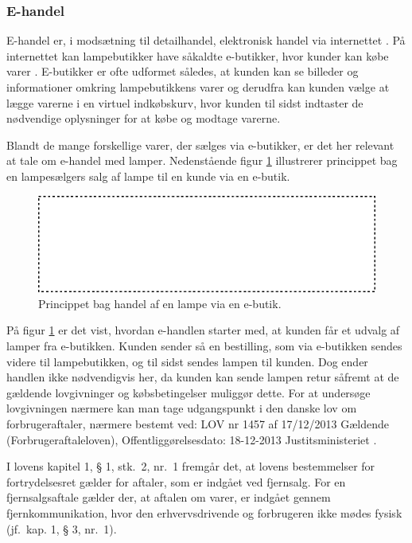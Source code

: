 \subsubsection{E-handel}
\label{sec:ehandel}
E-handel er, i modsætning til detailhandel, elektronisk handel via internettet \cite{ddo_ehandel}. På internettet kan lampebutikker have såkaldte e-butikker, hvor kunder kan købe varer \cite{ddo_ebutik}. E-butikker er ofte udformet således, at kunden kan se billeder og informationer omkring lampebutikkens varer og derudfra kan kunden vælge at lægge varerne i en virtuel indkøbskurv, hvor kunden til sidst indtaster de nødvendige oplysninger for at købe og modtage varerne.

Blandt de mange forskellige varer, der sælges via e-butikker, er det her relevant at tale om e-handel med lamper. Nedenstående figur \ref{fig:e_handel_med_lamper} illustrerer princippet bag en lampesælgers salg af lampe til en kunde via en e-butik.

\begin{figure}[H]
  \includegraphics{e_handel_med_lampe.pdf}
  \caption{Princippet bag handel af en lampe via en e-butik.}
    \label{fig:e_handel_med_lamper}
\end{figure}

På figur \ref{fig:e_handel_med_lamper} er det vist, hvordan e-handlen starter med, at kunden får et udvalg af lamper fra e-butikken. Kunden sender så en bestilling, som via e-butikken sendes videre til lampebutikken, og til sidst sendes lampen til kunden. Dog ender handlen ikke nødvendigvis her, da kunden kan sende lampen retur såfremt at de gældende lovgivninger og købsbetingelser muliggør dette. For at undersøge lovgivningen nærmere kan man tage udgangspunkt i den danske lov om forbrugeraftaler, nærmere bestemt ved: LOV nr 1457 af 17/12/2013 Gældende (Forbrugeraftaleloven), Offentliggørelsesdato: 18-12-2013
Justitsministeriet \cite{retsinformationen}.

I lovens kapitel 1, § 1, stk.\ 2, nr.\ 1 fremgår det, at lovens bestemmelser for fortrydelsesret gælder for aftaler, som er indgået ved fjernsalg. For en  fjernsalgsaftale gælder der, at aftalen om varer, er indgået gennem fjernkommunikation, hvor den erhvervsdrivende og forbrugeren ikke mødes fysisk (jf.\ kap. 1, § 3, nr.\ 1).

